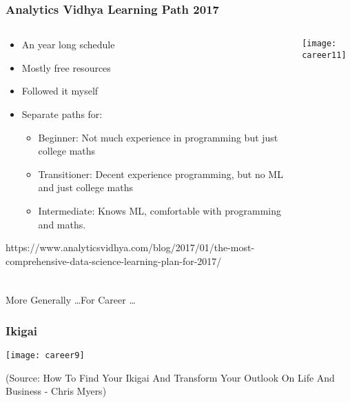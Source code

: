 \begin{frame}[fragile]\frametitle{Analytics Vidhya Learning Path 2017}
\begin{columns}
    \begin{column}[T]{0.5\linewidth}
      \begin{itemize}
			\item An year long schedule
			\item Mostly free resources
			\item Followed it myself
			\item Separate paths for:
			      \begin{itemize}

						\item Beginner: Not much experience in programming but just college maths
						\item Transitioner: Decent experience programming, but no ML and just college maths
						\item Intermediate: Knows ML, comfortable with programming and maths.
						\end{itemize}
			\end{itemize}
				https://www.analyticsvidhya.com/blog/2017/01/the-most-comprehensive-data-science-learning-plan-for-2017/

		\end{column}
    \begin{column}[T]{0.5\linewidth}
		
	\begin{center}
	\texttt{[image: career11]}
	\end{center}
    \end{column}
  \end{columns}
	
	
\end{frame}

\begin{frame}[fragile]\frametitle{}
	
	\begin{center}
	{\Large More Generally \ldots For Career \ldots}  
	\end{center}

\end{frame}


\begin{frame}[fragile]\frametitle{Ikigai}
	
	\begin{center}
	\texttt{[image: career9]}
	\end{center}
	
	{\tiny (Source:  How To Find Your Ikigai And Transform Your Outlook On Life And Business - Chris Myers)}

\end{frame}

